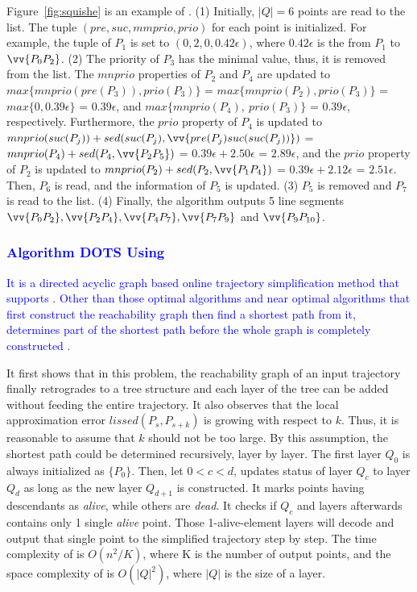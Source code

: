 \begin{example}
	\label{exm-alg-squishe}
	Figure~\ref{fig:squishe} is an example of \squishe.
	(1) Initially, $|Q| = 6$ points are read to the list. The tuple $(pre, suc, mmprio, prio)$ for each point is initialized. For example, the tuple of $P_1$ is set to $(0, 2, 0, 0.42\epsilon)$, where $0.42\epsilon$ is the \sed from $P_1$ to $\vv{P_0P_2}$.
	(2) The priority of $P_3$ has the minimal value, thus, it is removed from the list.
	The $mnprio$ properties of $P_2$ and $P_4$ are updated to $max\{mnprio(pre(P_3)), prio(P_3)\}$ = $max\{mnprio(P_2), prio(P_3)\}$ = $max\{0, 0.39\epsilon\}$ = $0.39\epsilon$, and $max\{mnprio(P_4), ~prio(P_3)\}$ = $0.39\epsilon$, respectively.
	Furthermore, the $prio$ property of $P_4$ is updated to $mnprio(suc(P_j)) + sed(suc(P_j),\vv{pre(P_{j})suc(suc(P_{j}))})$ = $mnprio(P_4) + sed(P_4,\vv{P_2P_5})$ = $0.39\epsilon + 2.50\epsilon$ = $2.89\epsilon$, and the $prio$ property of $P_2$ is updated to $mnprio(P_2) + sed(P_2,\vv{P_1P_4})$ = $0.39\epsilon + 2.12\epsilon$ = $2.51\epsilon$.
	Then, $P_6$ is read, and the information of $P_5$ is updated.
	(3) $P_5$ is removed and $P_7$ is read to the list.
	(4) Finally, the algorithm outputs 5 line segments $\vv{P_0P_2},\vv{P_2P_4},\vv{P_4P_7},\vv{P_7P_9}$ and $\vv{P_9P_{10}}$.
\end{example}

\subsubsection{\textcolor{blue}{Algorithm DOTS Using \lissed~\cite{Cao:Dots}}}
\textcolor{blue}{It is a directed acyclic graph based online trajectory simplification method that supports \lissed. Other than those optimal algorithms and near optimal algorithms \cite{Chen:Fast,Daescu:metric} that first construct the reachability graph then find a shortest path from it, \dagots determines part of the shortest path before the whole graph is completely constructed \cite{Cao:Dots}.}

It first shows that in this problem, the reachability graph of an input trajectory finally retrogrades to a tree structure and each layer of the tree can be added without feeding the entire trajectory. 
It also observes that the local approximation error $lissed(P_s,P_{s+k})$ is growing with respect to $k$. Thus, it is reasonable to assume that $k$ should not be too large. 
By this assumption, the shortest path could be determined recursively, \ie layer by layer.
%
The first layer $Q_0$ is always initialized as $\{P_0\}$. Then, let $0<c<d$, \dagots updates status of layer $Q_c$ to layer $Q_d$ as long as the new layer $Q_{d+1}$ is constructed. It marks points having descendants as \emph{alive}, while others are \emph{dead}.
It checks if $Q_c$ and layers afterwards contains only 1 single \emph{alive} point. Those 1-alive-element layers will decode and output that single point to the simplified trajectory step by step. The time complexity of \dagots is $O(n^2/K)$, where K is the number of output points, and the space complexity of \dagots is $O(|Q|^2)$, where $|Q|$ is the size of a layer.

